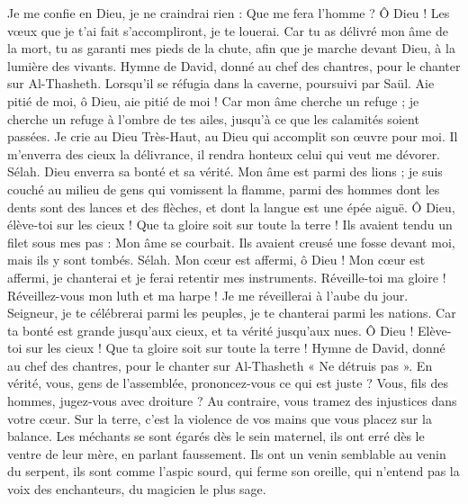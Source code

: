 \begin{multicols}{2}
Je me confie en Dieu, je ne craindrai rien : Que me fera l'homme ?
Ô Dieu ! Les vœux que je t'ai fait s'accompliront, je te louerai.
Car tu as délivré mon âme de la mort, tu as garanti mes pieds de la chute, afin que je marche devant Dieu, à la lumière des vivants.
\VerseOne{}Hymne de David, donné au chef des chantres, pour le chanter sur Al-Thasheth. Lorsqu'il se réfugia dans la caverne, poursuivi par Saül.
Aie pitié de moi, ô Dieu, aie pitié de moi ! Car mon âme cherche un refuge ; je cherche un refuge à l'ombre de tes ailes, jusqu'à ce que les calamités soient passées.
Je crie au Dieu Très-Haut, au Dieu qui accomplit son œuvre pour moi.
Il m'enverra des cieux la délivrance, il rendra honteux celui qui veut me dévorer. Sélah. Dieu enverra sa bonté et sa vérité.
Mon âme est parmi des lions ; je suis couché au milieu de gens qui vomissent la flamme, parmi des hommes dont les dents sont des lances et des flèches, et dont la langue est une épée aiguë.
Ô Dieu, élève-toi sur les cieux ! Que ta gloire soit sur toute la terre !
Ils avaient tendu un filet sous mes pas : Mon âme se courbait. Ils avaient creusé une fosse devant moi, mais ils y sont tombés. Sélah.
Mon cœur est affermi, ô Dieu ! Mon cœur est affermi, je chanterai et je ferai retentir mes instruments.
Réveille-toi ma gloire ! Réveillez-vous mon luth et ma harpe ! Je me réveillerai à l'aube du jour.
Seigneur, je te célébrerai parmi les peuples, je te chanterai parmi les nations.
Car ta bonté est grande jusqu'aux cieux, et ta vérité jusqu'aux nues.
Ô Dieu ! Elève-toi sur les cieux ! Que ta gloire soit sur toute la terre !
\VerseOne{}Hymne de David, donné au chef des chantres, pour le chanter sur Al-Thasheth « Ne détruis pas ».
En vérité, vous, gens de l'assemblée, prononcez-vous ce qui est juste ? Vous, fils des hommes, jugez-vous avec droiture ?
Au contraire, vous tramez des injustices dans votre cœur. Sur la terre, c'est la violence de vos mains que vous placez sur la balance.
Les méchants se sont égarés dès le sein maternel, ils ont erré dès le ventre de leur mère, en parlant faussement.
Ils ont un venin semblable au venin du serpent, ils sont comme l'aspic sourd, qui ferme son oreille,
qui n'entend pas la voix des enchanteurs, du magicien le plus sage.

\end{multicols}
